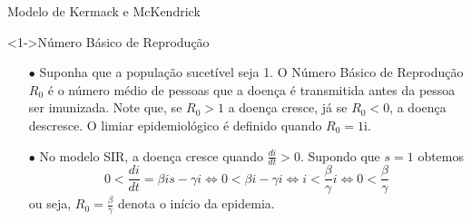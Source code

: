 \documentclass{beamer}
\theoremstyle{plain}
\theoremstyle{definition}
\begin{document}
\begin{frame}{Modelo de Kermack e McKendrick}


    \small
    \begin{exampleblock}
        <1->{Número Básico de Reprodução}

        \begin{itemize}
            \item [$\bullet$] Suponha que a população sucetível seja 1. O Número Básico de Reprodução 
                $R_0$ é o número médio de pessoas que a doença é transmitida antes da pessoa ser 
                imunizada. Note que, se $R_0>1$ a doença cresce, já se $R_0<0$, a doença descresce. 
                O limiar epidemiológico é definido quando $R_0 = 1$i.
            \item [$\bullet$] No modelo SIR, a doença cresce quando $\frac{di}{dt} > 0$. Supondo que 
                $s=1$ obtemos
                \[
                 0 < \frac{di}{dt} = \beta i s - \gamma i \iff 
                 0 < \beta i - \gamma i \iff 
                 i < \frac{\beta}{\gamma}i \iff 
                 0 < \frac{\beta}{\gamma}
                \]
                ou seja, $R_0 = \frac{\beta}{\gamma}$ denota o início da epidemia.
        \end{itemize}

    \end{exampleblock} 
    
\end{frame}
\end{document}
